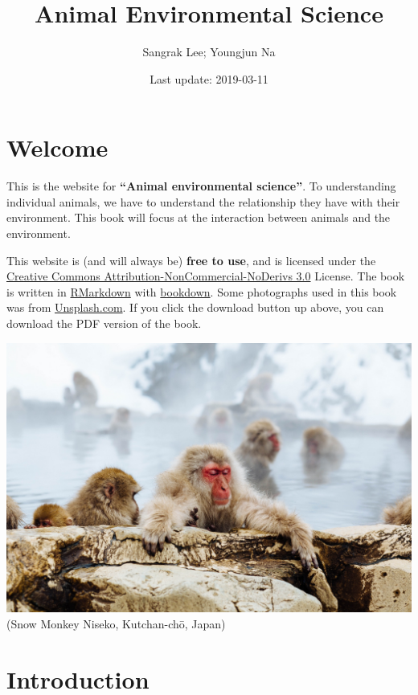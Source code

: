 \documentclass[]{book}
\title{Animal Environmental Science}
\author{Sangrak Lee; Youngjun Na}
\date{Last update: 2019-03-11}
\begin{document}
\maketitle

{
\setcounter{tocdepth}{1}
\tableofcontents
}
\chapter*{Welcome}\label{welcome}

This is the website for \textbf{``Animal environmental science''}. To
understanding individual animals, we have to understand the relationship
they have with their environment. This book will focus at the
interaction between animals and the environment.

This website is (and will always be) \textbf{free to use}, and is
licensed under the
\href{http://creativecommons.org/licenses/by-nc-nd/3.0/us/}{Creative
Commons Attribution-NonCommercial-NoDerivs 3.0} License. The book is
written in \href{https://rmarkdown.rstudio.com}{RMarkdown} with
\href{https://bookdown.org}{bookdown}. Some photographs used in this
book was from \href{https://unsplash.com/}{Unsplash.com}. If you click
the download button up above, you can download the PDF version of the
book.

\includegraphics{figures/monkey.jpeg}\\
(Snow Monkey Niseko, Kutchan-chō, Japan)

\chapter{Introduction}\label{intro}
\end{document}
